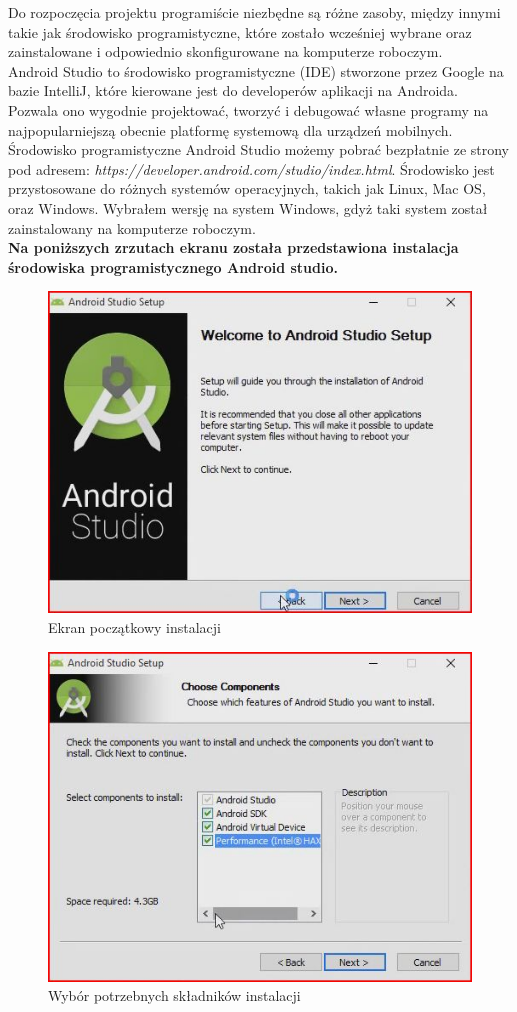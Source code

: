 Do rozpoczęcia projektu programiście niezbędne są różne zasoby, między innymi takie jak środowisko programistyczne, które zostało wcześniej wybrane oraz zainstalowane i odpowiednio skonfigurowane na komputerze roboczym.
\\

Android Studio to środowisko programistyczne (IDE) stworzone przez Google na bazie IntelliJ, które kierowane jest do developerów aplikacji na Androida. Pozwala ono wygodnie projektować, tworzyć i debugować własne programy na najpopularniejszą obecnie platformę systemową dla urządzeń mobilnych.
\\

Środowisko programistyczne Android Studio możemy pobrać bezpłatnie ze strony pod adresem: \textit{https://developer.android.com/studio/index.html}. Środowisko jest przystosowane do różnych systemów operacyjnych, takich jak Linux, Mac OS, oraz Windows. Wybrałem wersję na system Windows, gdyż taki system został zainstalowany na komputerze roboczym.
\\


\textbf{Na poniższych zrzutach ekranu została przedstawiona instalacja środowiska programistycznego Android studio.}

\begin{figure}[h!]
\centering
\includegraphics[width=0.5\linewidth]{fig/i1}
\caption{Ekran początkowy instalacji}
\label{fig:11}
\end{figure}

\begin{figure}[h!]
\centering
\includegraphics[width=0.5\linewidth]{fig/i2}
\caption{Wybór potrzebnych składników instalacji}
\label{fig:12}
\end{figure}

